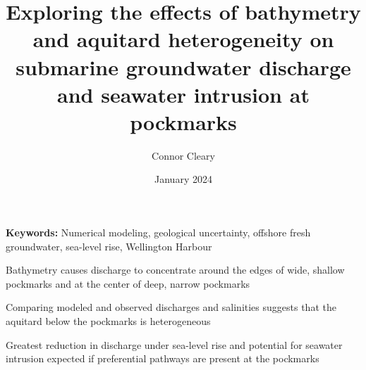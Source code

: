 \documentclass[draft, 10pt]{agujournal2019}
\author{Connor Cleary}
\date{January 2024}
\begin{document}

\justify




 
\title{Exploring the effects of bathymetry and aquitard heterogeneity on submarine groundwater discharge and seawater intrusion at pockmarks} 




\noindent \textbf{Keywords:} Numerical modeling, geological uncertainty, offshore fresh groundwater, sea-level rise, Wellington Harbour


\begin{keypoints}
\item Bathymetry causes discharge to concentrate around the edges of wide, shallow pockmarks and at the center of deep, narrow pockmarks
\item Comparing modeled and observed discharges and salinities suggests that the aquitard below the pockmarks is heterogeneous
\item Greatest reduction in discharge under sea-level rise and potential for seawater intrusion expected if preferential pathways are present at the pockmarks
\end{keypoints}
\end{document}
